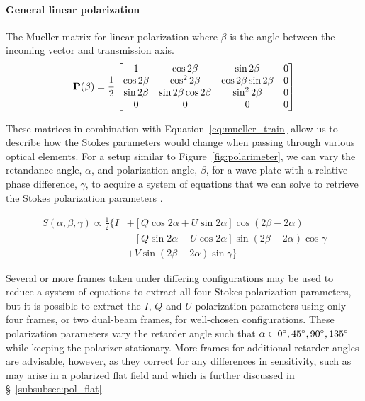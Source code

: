 \paragraph{General linear polarization}
The Mueller matrix for linear polarization where $\beta$ is the angle between the incoming vector and transmission axis.
\begin{equation}
  \mathbf{P}(\beta) = \frac{1}{2}
  \begin{bmatrix}
    1            & \cos 2 \beta              & \sin 2 \beta              & 0 \\
    \cos 2 \beta & \cos^{2} 2 \beta          & \cos 2 \beta \sin 2 \beta & 0 \\
    \sin 2 \beta & \sin 2 \beta \cos 2 \beta & \sin^{2} 2 \beta          & 0 \\
    0            & 0                         & 0                         & 0 \\
  \end{bmatrix}
  \label{matrix:polarizer}
\end{equation}
\prgph

These matrices in combination with Equation~\ref{eq:mueller_train} allow us to describe how the Stokes parameters would change when passing through various optical elements. For a setup similar to Figure~\ref{fig:polarimeter}, we can vary the retandance angle, $\alpha$, and polarization angle, $\beta$, for a wave plate with a relative phase difference, $\gamma$, to acquire a system of equations that we can solve to retrieve the Stokes polarization parameters \citep{waveplate_in_specpol}.

\begin{equation}
  \begin{split}
    S(\alpha, \beta, \gamma) \propto \frac{1}{2} \{ I & + [Q \cos2\alpha + U \sin2\alpha] \cos(2\beta - 2\alpha) \\
    & - [Q \sin2\alpha + U \cos2\alpha] \sin(2\beta - 2\alpha) \cos\gamma \label{eq:Stokes_intensity} \\
    & + V \sin(2\beta - 2\alpha)\sin\gamma \}
  \end{split}
\end{equation}

Several or more frames taken under differing configurations may be used to reduce a system of equations to extract all four Stokes polarization parameters, but it is possible to extract the $I$, $Q$ and $U$ polarization parameters using only four frames, or two dual-beam frames, for well-chosen configurations. These polarization parameters vary the retarder angle such that $\alpha \in {0\hbox{$^\circ$}, 45\hbox{$^\circ$}, 90\hbox{$^\circ$}, 135\hbox{$^\circ$}}$ while keeping the polarizer stationary. More frames for additional retarder angles are advisable, however, as they correct for any differences in sensitivity, such as may arise in a polarized flat field and which is further discussed in \S~\ref{subsubsec:pol_flat}.
\prgph


